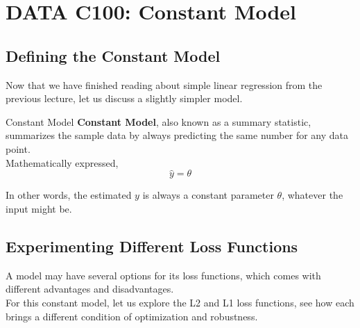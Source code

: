 \chapter{DATA C100: Constant Model}

\section{Defining the Constant Model}
Now that we have finished reading about simple linear regression from the previous lecture, let us discuss a slightly simpler model.
\begin{ln-define}{Constant Model}{}
    \textbf{Constant Model}, also known as a summary statistic, summarizes the sample data by always predicting the same number for any data point. \\
    Mathematically expressed,
    \[\hat{y} = \theta\]
\end{ln-define}
In other words, the estimated $y$ is always a constant parameter $\theta$, whatever the input might be.

\section{Experimenting Different Loss Functions}
A model may have several options for its loss functions, which comes with different advantages and disadvantages. \\
For this constant model, let us explore the L2 and L1 loss functions, see how each brings a different condition of optimization and robustness.

